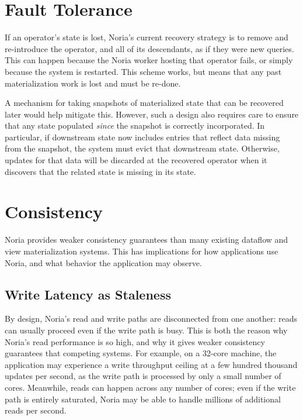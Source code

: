 \section{Fault Tolerance}

If an operator's state is lost, Noria's current recovery strategy is to remove
and re-introduce the operator, and all of its descendants, as if they were new
queries. This can happen because the Noria worker hosting that operator fails,
or simply because the system is restarted. This scheme works, but means that any
past materialization work is lost and must be re-done.

A mechanism for taking snapshots of materialized state that can be recovered
later would help mitigate this. However, such a design also requires care to
ensure that any state populated \emph{since} the snapshot is correctly
incorporated. In particular, if downstream state now includes entries that
reflect data missing from the snapshot, the system must evict that downstream
state. Otherwise, updates for that data will be discarded at the recovered
operator when it discovers that the related state is missing in its state.

\section{Consistency}

Noria provides weaker consistency guarantees than many existing dataflow and
view materialization systems. This has implications for how applications use
Noria, and what behavior the application may observe.

\subsection{Write Latency as Staleness}

By design, Noria's read and write paths are disconnected from one another: reads
can usually proceed even if the write path is busy. This is both the reason why
Noria's read performance is so high, and why it gives weaker consistency
guarantees that competing systems. For example, on a 32-core machine, the
application may experience a write throughput ceiling at a few hundred thousand
updates per second, as the write path is processed by only a small number of
cores. Meanwhile, reads can happen across any number of cores; even if the write
path is entirely saturated, Noria may be able to handle millions of additional
reads per second.

